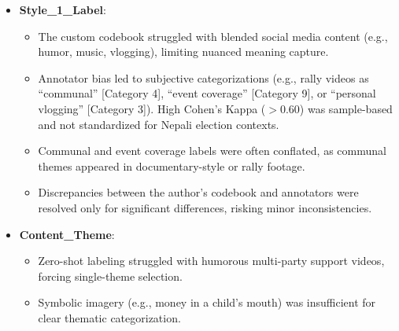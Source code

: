 \documentclass[12pt,a4paper]{report}
\begin{document}
\begin{itemize}
    \item \textbf{Style\_1\_Label}:
        \begin{itemize}
            \item The custom codebook struggled with blended social media content (e.g., humor, music, vlogging), limiting nuanced meaning capture.
            \item Annotator bias led to subjective categorizations (e.g., rally videos as ``communal'' [Category 4], ``event coverage'' [Category 9], or ``personal vlogging'' [Category 3]). High Cohen’s Kappa ($>0.60$) was sample-based and not standardized for Nepali election contexts.
            \item Communal and event coverage labels were often conflated, as communal themes appeared in documentary-style or rally footage.
            \item Discrepancies between the author’s codebook and annotators were resolved only for significant differences, risking minor inconsistencies.
        \end{itemize}

    \item \textbf{Content\_Theme}:
        \begin{itemize}
            \item Zero-shot labeling struggled with humorous multi-party support videos, forcing single-theme selection.
            \item Symbolic imagery (e.g., money in a child’s mouth) was insufficient for clear thematic categorization.
        \end{itemize}


\end{itemize}
\end{document}
